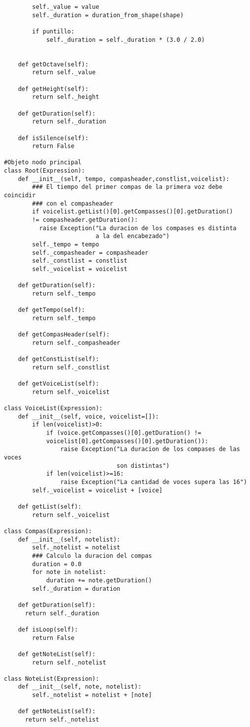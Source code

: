 \begin{verbatim}
        self._value = value
        self._duration = duration_from_shape(shape)

        if puntillo:
            self._duration = self._duration * (3.0 / 2.0)


    def getOctave(self):
        return self._value

    def getHeight(self):
        return self._height

    def getDuration(self):
        return self._duration

    def isSilence(self):
        return False

#Objeto nodo principal
class Root(Expression):
    def __init__(self, tempo, compasheader,constlist,voicelist):
        ### El tiempo del primer compas de la primera voz debe coincidir 
        ### con el compasheader
        if voicelist.getList()[0].getCompasses()[0].getDuration()
        != compasheader.getDuration():
          raise Exception("La duracion de los compases es distinta
                          a la del encabezado")
        self._tempo = tempo
        self._compasheader = compasheader
        self._constlist = constlist
        self._voicelist = voicelist

    def getDuration(self):
        return self._tempo

    def getTempo(self):
        return self._tempo

    def getCompasHeader(self):
        return self._compasheader

    def getConstList(self):
        return self._constlist

    def getVoiceList(self):
        return self._voicelist

class VoiceList(Expression):
    def __init__(self, voice, voicelist=[]):
        if len(voicelist)>0:
            if (voice.getCompasses()[0].getDuration() !=
            voicelist[0].getCompasses()[0].getDuration()):
                raise Exception("La duracion de los compases de las voces 
                                son distintas")
            if len(voicelist)>=16:
            	raise Exception("La cantidad de voces supera las 16")
        self._voicelist = voicelist + [voice]

    def getList(self):
        return self._voicelist

class Compas(Expression):
    def __init__(self, notelist):
        self._notelist = notelist
        ### Calculo la duracion del compas
        duration = 0.0
        for note in notelist:
            duration += note.getDuration()
        self._duration = duration

    def getDuration(self):
      return self._duration

    def isLoop(self):
        return False

    def getNoteList(self):
        return self._notelist

class NoteList(Expression):
    def __init__(self, note, notelist):
        self._notelist = notelist + [note]

    def getNoteList(self):
      return self._notelist
\end{verbatim}

